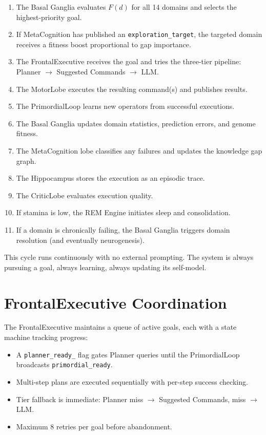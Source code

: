\documentclass[12pt,a4paper]{report}
\begin{document}
\begin{enumerate}
    \item The Basal Ganglia evaluates $F(d)$ for all 14 domains and selects the highest-priority goal.
    \item If MetaCognition has published an \texttt{exploration\_target}, the targeted domain receives a fitness boost proportional to gap importance.
    \item The FrontalExecutive receives the goal and tries the three-tier pipeline: Planner $\to$ Suggested Commands $\to$ LLM.
    \item The MotorLobe executes the resulting command(s) and publishes results.
    \item The PrimordialLoop learns new operators from successful executions.
    \item The Basal Ganglia updates domain statistics, prediction errors, and genome fitness.
    \item The MetaCognition lobe classifies any failures and updates the knowledge gap graph.
    \item The Hippocampus stores the execution as an episodic trace.
    \item The CriticLobe evaluates execution quality.
    \item If stamina is low, the REM Engine initiates sleep and consolidation.
    \item If a domain is chronically failing, the Basal Ganglia triggers domain resolution (and eventually neurogenesis).
\end{enumerate}

This cycle runs continuously with no external prompting. The system is always pursuing a goal, always learning, always updating its self-model.

\section{FrontalExecutive Coordination}
The FrontalExecutive maintains a queue of active goals, each with a state machine tracking progress:

\begin{itemize}
    \item A \texttt{planner\_ready\_} flag gates Planner queries until the PrimordialLoop broadcasts \texttt{primordial\_ready}.
    \item Multi-step plans are executed sequentially with per-step success checking.
    \item Tier fallback is immediate: Planner miss $\to$ Suggested Commands, miss $\to$ LLM.
    \item Maximum 8 retries per goal before abandonment.
\end{itemize}
\end{document}
